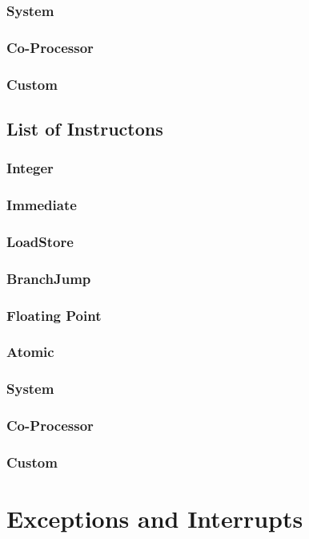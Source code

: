 \documentclass[letterpaper]{article}
\begin{document}
\subsubsection{System}
\subsubsection{Co-Processor}
\subsubsection{Custom}
\subsection{List of Instructons}
\subsubsection{Integer}
\subsubsection{Immediate}
\subsubsection{Load\/Store}
\subsubsection{Branch\/Jump}
\subsubsection{Floating Point}
\subsubsection{Atomic}
\subsubsection{System}
\subsubsection{Co-Processor}
\subsubsection{Custom}


\section{Exceptions and Interrupts}
\end{document}
